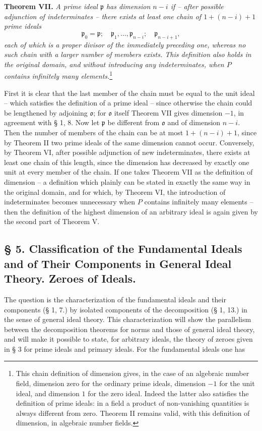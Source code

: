 \documentclass[11pt]{article}
\providecommand{\frakp}{\mathfrak p}
\providecommand{\frako}{\mathfrak o}
\providecommand{\frako}{\mathfrak o}
\providecommand{\frakp}{\mathfrak p}
\providecommand{\frakp}{\mathfrak p}
\begin{document}
\textbf{Theorem VII.} \emph{A prime ideal $\frakp$ has dimension $n-i$ if -- after possible adjunction of indeterminates -- there exists at least one chain of $1+(n-i)+1$ prime ideals}
\[
 \frakp_0=\frakp;\quad \frakp_1,\ldots,\frakp_{n-i};\quad \frakp_{n-i+1},
\]
\emph{each of which is a proper divisor of the immediately preceding one, whereas no such chain with a larger number of members exists. This definition also holds in the original domain, and without introducing any indeterminates, when $P$ contains infinitely many elements.}\footnote{This chain definition of dimension gives, in the case of an algebraic number field, dimension zero for the ordinary prime ideals, dimension $-1$ for the unit ideal, and dimension $1$ for the zero ideal. Indeed the latter also satisfies the definition of prime ideals: in a field a product of non-vanishing quantities is always different from zero. Theorem II remains valid, with this definition of dimension, in algebraic number fields.}

First it is clear that the last member of the chain must be equal to the unit ideal -- which satisfies the definition of a prime ideal -- since otherwise the chain could be lengthened by adjoining $\frako$; for $\frako$ itself Theorem VII gives dimension $-1$, in agreement with § 1, 8. Now let $\frakp$ be different from $\frako$ and of dimension $n-i$. Then the number of members of the chain can be at most $1+(n-i)+1$, since by Theorem II two prime ideals of the same dimension cannot occur. Conversely, by Theorem VI, after possible adjunction of new indeterminates, there exists at least one chain of this length, since the dimension has decreased by exactly one unit at every member of the chain. If one takes Theorem VII as the definition of dimension -- a definition which plainly can be stated in exactly the same way in the original domain, and for which, by Theorem VI, the introduction of indeterminates becomes unnecessary when $P$ contains infinitely many elements -- then the definition of the highest dimension of an arbitrary ideal is again given by the second part of Theorem V.

\subsection*{§ 5. Classification of the Fundamental Ideals and of Their Components in General Ideal Theory. Zeroes of Ideals.}

The question is the characterization of the fundamental ideals and their components (§ 1, 7.) by isolated components of the decomposition (§ 1, 13.) in the sense of general ideal theory. This characterization will show the parallelism between the decomposition theorems for norms and those of general ideal theory, and will make it possible to state, for arbitrary ideals, the theory of zeroes given in § 3 for prime ideals and primary ideals. For the fundamental ideals one has
\end{document}
